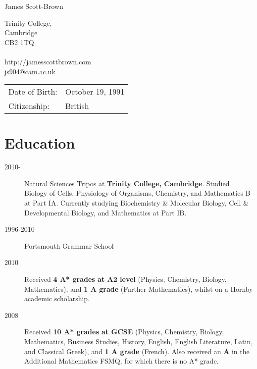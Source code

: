 \documentclass[letterpaper]{article}
\def\name{James Scott-Brown}
\begin{document}
{\huge \name}


\vspace{0.25in}
\begin{minipage}[t]{0.5\textwidth}
Trinity College,\\
Cambridge\\
CB2 1TQ\\ \\
http://jamesscottbrown.com\\
js904@cam.ac.uk \\
\end{minipage}
\begin{minipage}[t]{0.5\textwidth}
\begin{tabular}{ll}  	
Date of Birth: &October 19, 1991 \\
Citizenship: &British
\end{tabular}
\end{minipage}



\section*{Education}
\begin{description}
 \item[2010-] Natural Sciences Tripos at {\bf Trinity College, Cambridge}. Studied Biology of Cells, Physiology of Organisms, Chemistry, and Mathematics B at Part IA. Currently studying Biochemistry \& Molecular Biology, Cell \& Developmental Biology, and Mathematics at Part IB.
 \item[1996-2010] Portsmouth Grammar School 
 \item[2010] Received {\bf 4 A* grades at A2 level} (Physics, Chemistry, Biology, Mathematics), and {\bf 1 A grade} (Further Mathematics), whilst on a Hornby academic scholarship.
 \item[2008] Received {\bf 10 A* grades at GCSE} (Physics, Chemistry, Biology, Mathematics, Business Studies, History, English, English Literature, Latin, and Classical Greek), and {\bf 1 A grade} (French). Also received an {\bf A} in the Additional Mathematics FSMQ, for which there is no A* grade.
\end{description}
\end{document}
